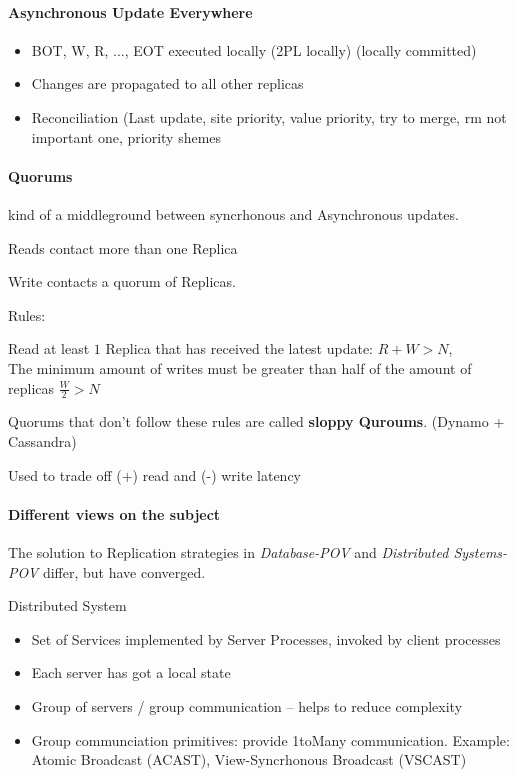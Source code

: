 \documentclass[a4paper,12pt]{article}%
\begin{document}
 
 
 \paragraph{Asynchronous Update Everywhere}
 \begin{itemize}
  \item BOT, W, R, ..., EOT executed locally (2PL locally) (locally committed) 
  \item Changes are propagated to all other replicas
  \item Reconciliation (Last update, site priority, value priority, try to merge, rm not important one, priority shemes
 \end{itemize}

 
 
 
 
 
 
 
 
 
 
 
 
 
 
 
 
 
 \paragraph{Quorums}
 kind of a middleground between syncrhonous and Asynchronous updates.
 
 Reads contact more than one Replica
 
 Write contacts a quorum of Replicas.
 
 Rules:
 
 Read at least $1$ Replica that has received the latest update: $R+W > N$,\\
 The minimum amount of writes must be greater than half of the amount of replicas $\frac{W}{2} > N$
 
 Quorums that don't follow these rules are called {\bf sloppy Quroums}. (Dynamo + Cassandra)
 
 Used to trade off (+) read and (-) write latency
 
 
 
 
 \paragraph{Different views on the subject}
 The solution to Replication strategies in {\it Database-POV} and {\it Distributed Systems-POV} differ, but have converged.
 
 
 Distributed System
 \begin{itemize}
  \item Set of Services implemented by Server Processes, invoked by client processes
  \item Each server has got a local state
  \item Group of servers / group communication -- helps to reduce complexity
  \item Group communciation primitives: provide 1toMany communication. Example:  Atomic Broadcast (ACAST), View-Syncrhonous Broadcast (VSCAST) 
 \end{itemize}
\end{document}
